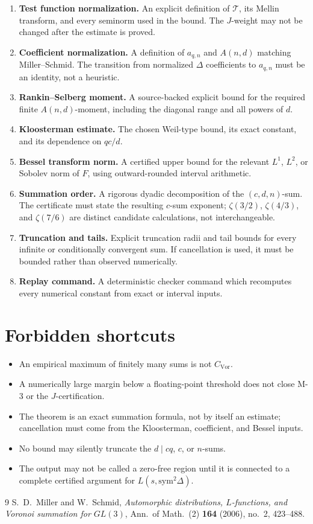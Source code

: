 \documentclass[12pt]{article}
\begin{document}
\begin{enumerate}
  \item \textbf{Test function normalization.} An explicit definition of
        \(\mathcal{T}\), its Mellin transform, and every seminorm used in the
        bound.  The \(J\)-weight may not be changed after the estimate is proved.
  \item \textbf{Coefficient normalization.} A definition of \(a_{q,n}\) and
        \(A(n,d)\) matching Miller--Schmid.  The transition from normalized
        \(\Delta\) coefficients to \(a_{q,n}\) must be an identity, not a
        heuristic.
  \item \textbf{Rankin--Selberg moment.} A source-backed explicit bound for the
        required finite \(A(n,d)\)-moment, including the diagonal range and all
        powers of \(d\).
  \item \textbf{Kloosterman estimate.} The chosen Weil-type bound, its exact
        constant, and its dependence on \(qc/d\).
  \item \textbf{Bessel transform norm.} A certified upper bound for the relevant
        \(L^1\), \(L^2\), or Sobolev norm of \(F\), using outward-rounded
        interval arithmetic.
  \item \textbf{Summation order.} A rigorous dyadic decomposition of the
        \((c,d,n)\)-sum.  The certificate must state the resulting \(c\)-sum
        exponent; \(\zeta(3/2)\), \(\zeta(4/3)\), and \(\zeta(7/6)\) are distinct
        candidate calculations, not interchangeable.
  \item \textbf{Truncation and tails.} Explicit truncation radii and tail bounds
        for every infinite or conditionally convergent sum.  If cancellation is
        used, it must be bounded rather than observed numerically.
  \item \textbf{Replay command.} A deterministic checker command which recomputes
        every numerical constant from exact or interval inputs.
\end{enumerate}

\section{Forbidden shortcuts}

\begin{itemize}
  \item An empirical maximum of finitely many sums is not \(C_{\mathrm{Vor}}\).
  \item A numerically large margin below a floating-point threshold does not
        close M-3 or the \(J\)-certification.
  \item The theorem is an exact summation formula, not by itself an estimate;
        cancellation must come from the Kloosterman, coefficient, and Bessel
        inputs.
  \item No bound may silently truncate the \(d\mid cq\), \(c\), or \(n\)-sums.
  \item The output may not be called a zero-free region until it is connected
        to a complete certified argument for \(L(s,\mathrm{sym}^2\Delta)\).
\end{itemize}

\begin{thebibliography}{9}
 S.~D.~Miller and W.~Schmid,
  \emph{Automorphic distributions, \(L\)-functions, and Voronoi summation for
  \(GL(3)\)}, Ann.\ of Math.\ (2) \textbf{164} (2006), no.~2, 423--488.
\end{thebibliography}
\end{document}
